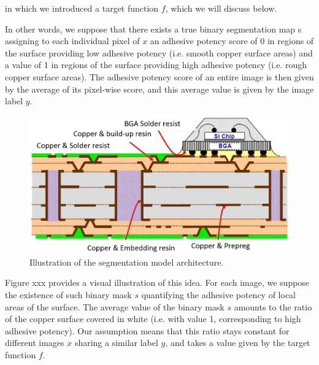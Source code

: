 \documentclass[10pt,twocolumn,letterpaper]{article}
\begin{document}
in which we introduced a target function $f$, which we will discuss below.

In other words, we suppose that there exists a true binary segmentation map
s assigning to each individual pixel of $x$ an adhesive potency score of 0 
in regions of the surface providing low adhesive potency (i.e. smooth copper surface areas)
and a value of 1 in regions of the surface providing high adhesive potency (i.e. rough copper surface areas).
The adhesive potency score of an entire image is then given by the average of its pixel-wise score,
and this average value is given by the image label $y$.

\begin{figure}[h]
	\centering
	\includegraphics[width=0.9\linewidth]{"./figures/Figure1"}
	\caption{
		Illustration of the segmentation model architecture.
	}
\end{figure}

Figure xxx provides a visual illustration of this idea.
For each image, we suppose the existence of such binary mask $s$
quantifying the adhesive potency of local areas of the surface.
The average value of the binary mask $s$ amounts to the ratio of the
copper surface covered in white (i.e. with value 1, corresponding to high adhesive potency).
Our assumption means that this ratio stays constant for different images $x$ sharing a similar label $y$,
and takes a value given by the target function $f$.
\end{document}
